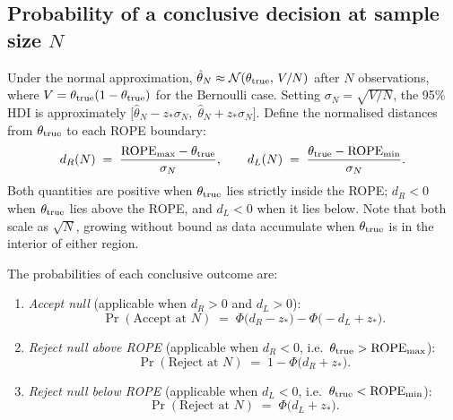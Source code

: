 \subsection*{Probability of a conclusive decision at sample size $N$}

Under the normal approximation, $\hat\theta_N \approx \mathcal{N}(\theta_{\rm true},\,V/N)$
after $N$ observations, where $V = \theta_{\rm true}(1-\theta_{\rm true})$ for the Bernoulli
case.
Setting $\sigma_N = \sqrt{V/N}$, the 95\% HDI is approximately
$\bigl[\hat\theta_N - z_*\sigma_N,\;\hat\theta_N + z_*\sigma_N\bigr]$.
Define the normalised distances from $\theta_{\rm true}$ to each ROPE boundary:
\begin{equation}\label{eq:normalised_distances}
    d_R(N) \;=\; \frac{\mathrm{ROPE}_{\rm max} - \theta_{\rm true}}{\sigma_N},
    \qquad
    d_L(N) \;=\; \frac{\theta_{\rm true} - \mathrm{ROPE}_{\rm min}}{\sigma_N}.
\end{equation}
Both quantities are positive when $\theta_{\rm true}$ lies strictly inside the ROPE;
$d_R < 0$ when $\theta_{\rm true}$ lies above the ROPE, and $d_L < 0$ when it lies below.
Note that both scale as $\sqrt{N}$, growing without bound as data accumulate when
$\theta_{\rm true}$ is in the interior of either region.

The probabilities of each conclusive outcome are:

\begin{enumerate}[label=(\alph*)]
    \item \textit{Accept null} (applicable when $d_R > 0$ and $d_L > 0$):
    \begin{equation}\label{eq:pr_accept}
        \Pr(\text{Accept at }N) \;=\; \Phi\!\bigl(d_R - z_*\bigr) - \Phi\!\bigl(-d_L + z_*\bigr).
    \end{equation}
    \item \textit{Reject null above ROPE} (applicable when $d_R < 0$, i.e.\
    $\theta_{\rm true} > \mathrm{ROPE}_{\rm max}$):
    \begin{equation}\label{eq:pr_reject_above}
        \Pr(\text{Reject at }N) \;=\; 1 - \Phi\!\bigl(d_R + z_*\bigr).
    \end{equation}
    \item \textit{Reject null below ROPE} (applicable when $d_L < 0$, i.e.\
    $\theta_{\rm true} < \mathrm{ROPE}_{\rm min}$):
    \begin{equation}\label{eq:pr_reject_below}
        \Pr(\text{Reject at }N) \;=\; \Phi\!\bigl(d_L + z_*\bigr).
    \end{equation}
\end{enumerate}

